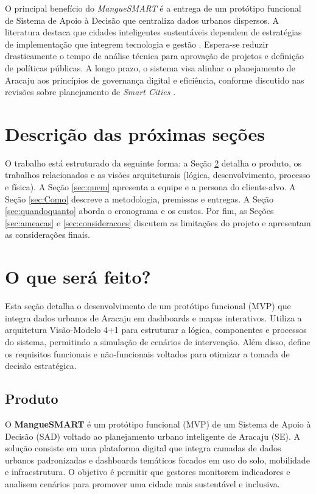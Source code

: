 \documentclass[12pt]{article}
\begin{document}
O principal benefício do \textit{MangueSMART} é a entrega de um protótipo funcional de Sistema de Apoio à Decisão que centraliza dados urbanos dispersos. A literatura destaca que cidades inteligentes sustentáveis dependem de estratégias de implementação que integrem tecnologia e gestão \cite{rdc2024}. Espera-se reduzir drasticamente o tempo de análise técnica para aprovação de projetos e definição de políticas públicas. A longo prazo, o sistema visa alinhar o planejamento de Aracaju aos princípios de governança digital e eficiência, conforme discutido nas revisões sobre planejamento de \textit{Smart Cities} \cite{iwasa2025}.

\section{Descrição das próximas seções} 
O trabalho está estruturado da seguinte forma: a Seção \ref{sec:oque} detalha o produto, os trabalhos relacionados e as visões arquiteturais (lógica, desenvolvimento, processo e física). A Seção \ref{sec:quem} apresenta a equipe e a persona do cliente-alvo. A Seção \ref{sec:Como} descreve a metodologia, premissas e entregas. A Seção \ref{sec:quandoquanto} aborda o cronograma e os custos. Por fim, as Seções \ref{sec:ameacas} e \ref{sec:consideracoes} discutem as limitações do projeto e apresentam as considerações finais.

\section{O que será feito?} \label{sec:oque}
Esta seção detalha o desenvolvimento de um protótipo funcional (MVP) que integra dados urbanos de Aracaju em dashboards e mapas interativos. Utiliza a arquitetura Visão-Modelo 4+1 para estruturar a lógica, componentes e processos do sistema, permitindo a simulação de cenários de intervenção. Além disso, define os requisitos funcionais e não-funcionais voltados para otimizar a tomada de decisão estratégica.

\subsection{Produto}

O \textbf{MangueSMART} é um protótipo funcional (MVP) de um Sistema de Apoio à Decisão (SAD) voltado ao planejamento urbano inteligente de Aracaju (SE). A solução consiste em uma plataforma digital que integra camadas de dados urbanos padronizadas e dashboards temáticos focados em uso do solo, mobilidade e infraestrutura. O objetivo é permitir que gestores monitorem indicadores e analisem cenários para promover uma cidade mais sustentável e inclusiva.
\end{document}
